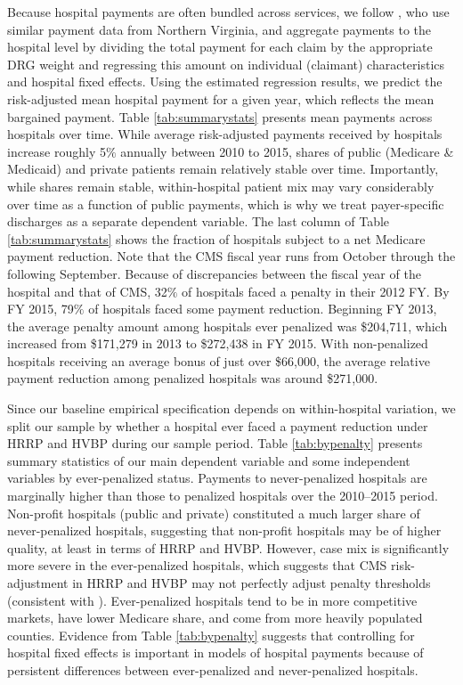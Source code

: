 \documentclass[12pt]{article}
\begin{document}
Because hospital payments are often bundled across services, we follow \citet{gowrisankaran2015}, who use similar payment data from Northern Virginia, and aggregate payments to the hospital level by dividing the total payment for each claim by the appropriate DRG weight and regressing this amount on individual (claimant) characteristics and hospital fixed effects.  Using the estimated regression results, we predict the risk-adjusted mean hospital payment for a given year, which reflects the mean bargained payment. Table \ref{tab:summarystats} presents mean payments across hospitals over time. While average risk-adjusted payments received by hospitals increase roughly 5$\%$ annually between 2010 to 2015, shares of public (Medicare \& Medicaid) and private patients remain relatively stable over time. Importantly, while shares remain stable, within-hospital patient mix may vary considerably over time as a function of public payments, which is why we treat payer-specific discharges as a separate dependent variable. The last column of Table \ref{tab:summarystats} shows the fraction of hospitals subject to a net Medicare payment reduction. Note that the CMS fiscal year runs from October through the following September. Because of discrepancies between the fiscal year of the hospital and that of CMS, 32$\%$ of hospitals faced a penalty in their 2012 FY. By FY 2015, 79$\%$ of hospitals faced some payment reduction. Beginning FY 2013, the average penalty amount among hospitals ever penalized was \$204,711, which increased from \$171,279 in 2013 to \$272,438 in FY 2015. With non-penalized hospitals receiving an average bonus of just over \$66,000, the average relative payment reduction among penalized hospitals was around \$271,000.

Since our baseline empirical specification depends on within-hospital variation, we split our sample by whether a hospital ever faced a payment reduction under HRRP and HVBP during our sample period.  Table \ref{tab:bypenalty} presents summary statistics of our main dependent variable and some independent variables by ever-penalized status.  Payments to never-penalized hospitals are marginally higher than those to penalized hospitals over the 2010--2015 period.  Non-profit hospitals (public and private) constituted a much larger share of never-penalized hospitals, suggesting that non-profit hospitals may be of higher quality, at least in terms of HRRP and HVBP. However, case mix is significantly more severe in the ever-penalized hospitals, which suggests that CMS risk-adjustment in HRRP and HVBP may not perfectly adjust penalty thresholds (consistent with \cite{wilcock2018}). Ever-penalized hospitals tend to be in more competitive markets, have lower Medicare share, and come from more heavily populated counties.  Evidence from Table \ref{tab:bypenalty} suggests that controlling for hospital fixed effects is important in models of hospital payments because of persistent differences between ever-penalized and never-penalized hospitals.
\end{document}
